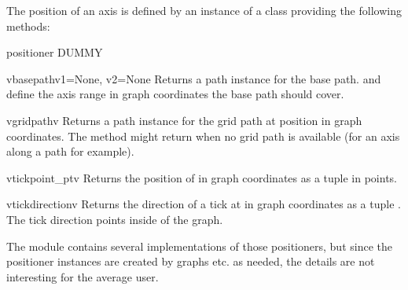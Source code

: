 
The position of an axis is defined by an instance of a class providing
the following methods:

\begin{classdesc}{positioner}{}
  DUMMY
\end{classdesc}

\begin{methoddesc}{vbasepath}{v1=None, v2=None}
  Returns a path instance for the base path.  and 
  define the axis range in graph coordinates the base path should
  cover.
\end{methoddesc}

\begin{methoddesc}{vgridpath}{v}
  Returns a path instance for the grid path at position  in
  graph coordinates. The method might return  when no grid
  path is available (for an axis along a path for example).
\end{methoddesc}

\begin{methoddesc}{vtickpoint_pt}{v}
  Returns the position of  in graph coordinates as a tuple
   in points.
\end{methoddesc}

\begin{methoddesc}{vtickdirection}{v}
  Returns the direction of a tick at  in graph coordinates as a
  tuple . The tick direction points inside of the
  graph.
\end{methoddesc}

The module contains several implementations of those positioners, but
since the positioner instances are created by graphs etc. as needed,
the details are not interesting for the average \PyX{} user.


